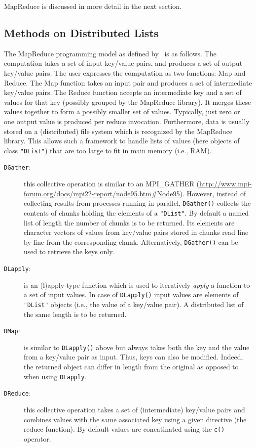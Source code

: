 \documentclass[fleqn]{article}
\let\code=\texttt
\newcommand{\class}[1]{\code{"#1"}}
\begin{document}
MapReduce is discussed in more detail in the next section.


\subsection{Methods on Distributed Lists}
\label{sec:methods}

The MapReduce programming model as defined
by~\cite{Dean+Ghemawat:2004} is as follows. The computation takes a
set of input key/value pairs, and produces a set of output key/value
pairs. The user expresses the computation as two functions: Map and
Reduce. The Map function takes an input pair and produces a set of
intermediate key/value pairs. The Reduce function accepts an
intermediate key and a set of values for that key (possibly grouped by
the MapReduce library). It merges these values together to form a
possibly smaller set of values. Typically, just zero or one output
value is produced per reduce invocation. Furthermore, data is usually
stored on a (distributed) file system which is recognized by the
MapReduce library. This allows such a framework to handle lists of
values (here objects of class \class{DList}) that are too large to fit
in main memory (i.e., RAM).

\begin{description}
\item[\code{DGather}:] this collective operation is similar to an
  MPI\_GATHER
  (\url{http://www.mpi-forum.org/docs/mpi22-report/node95.htm#Node95}). However,
  instead of collecting results from processes running in parallel,
  \code{DGather()} collects the contents of chunks holding the
  elements of a \class{DList}. By default a named list of length the
  number of chunks is to be returned. Its elements are character
  vectors of values from key/value pairs stored in chunks read line by
  line from the corresponding chunk. Alternatively, \code{DGather()}
  can be used to retrieve the keys only.
\item[\code{DLapply}:] is an (l)apply-type function which is used to
  iteratively \emph{apply} a function to a set of input values. In
  case of \code{DLapply()} input values are elements of \class{DList}
  objects (i.e., the value of a key/value pair). A distributed list of
  the same length is to be returned.
\item[\code{DMap}:] is similar to \code{DLapply()} above but always
  takes both the key and the value from a key/value pair as
  input. Thus, keys can also be modified. Indeed, the returned object
  can differ in length from the original as opposed to when using
  \code{DLapply}.
\item[\code{DReduce}:] this collective operation takes a set of
  (intermediate) key/value pairs and combines
  values with the same associated key using a given directive (the
  reduce function). By default values are concatinated using the
  \code{c()} operator.
\end{description}
\end{document}
